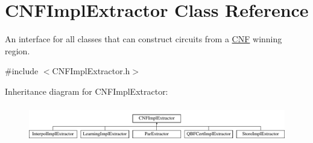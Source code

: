 \hypertarget{classCNFImplExtractor}{\section{C\-N\-F\-Impl\-Extractor Class Reference}
\label{classCNFImplExtractor}
}


An interface for all classes that can construct circuits from a \hyperlink{classCNF}{C\-N\-F} winning region.  




{\ttfamily \#include $<$C\-N\-F\-Impl\-Extractor.\-h$>$}

Inheritance diagram for C\-N\-F\-Impl\-Extractor\-:\begin{figure}[H]
\begin{center}
\leavevmode
\includegraphics[height=1.566434cm]{classCNFImplExtractor}
\end{center}
\end{figure}

